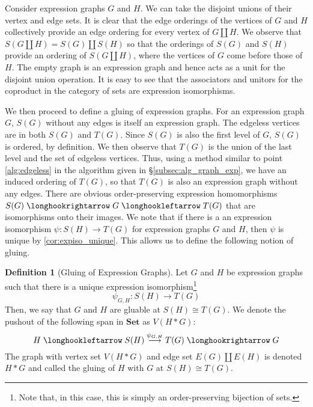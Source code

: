 \documentclass{amsart}
\renewcommand{\to}[1][]{\stackrel{#1}{\longrightarrow}}
\newcommand{\hto}[1][]{\stackrel{#1}{\longhookrightarrow}}
\newcommand{\hot}[1][]{\stackrel{#1}{\longhookleftarrow}}
\newcommand{\Set}{\textbf{Set}}
\numberwithin{thm}{section}
\theoremstyle{definition}
\newtheorem{defn}[thm]{Definition}
\begin{document}
Consider expression graphs $G$ and $H$. We can take the disjoint unions of their
vertex and edge sets. It is clear that the edge orderings of the vertices of
$G$ and $H$ collectively provide an edge ordering for every vertex of
$G \amalg H$. We observe that $S(G \amalg H) = S(G) \amalg S(H)$ so that the
orderings of $S(G)$ and $S(H)$ provide an ordering of $S(G \amalg H)$, where the
vertices of $G$ come before those of $H$. The empty graph is an expression graph
and hence acts as a unit for the disjoint union operation. It is easy to see
that the associators and unitors for the coproduct in the category of sets are
expression isomorphisms.

We then proceed to define a gluing of expression graphs. For an expression
graph $G$, $S(G)$ without any edges is itself an expression graph.
The edgeless vertices are in both $S(G)$ and $T(G)$. Since $S(G)$ is also the
first level of $G$, $S(G)$ is ordered, by definition. We then observe that
$T(G)$ is the union of the last level and the set of edgeless vertices. Thus,
using a method similar to point \ref{alg:edgeless} in the algorithm given in
\S\ref{subsec:alg_graph_exp}, we have an induced ordering of $T(G)$, so that
$T(G)$ is also an expression graph without any edges.
There are obvious order-preserving expression homomorphisms
$S(G) \hto G \hot T(G)$ that are isomorphisms onto their images. We note
that if there is a an expression isomorphism $\psi : S(H) \to T(G)$ for
expression graphs $G$ and $H$, then $\psi$ is unique by \ref{cor:expiso_unique}.
This allows us to define the following notion of gluing.

\begin{defn}[Gluing of Expression Graphs]
Let $G$ and $H$ be expression graphs such that there is a unique expression
isomorphism\footnote{Note that, in this case, this is simply an order-preserving
bijection of sets.}
\[
  \psi_{G, H} : S(H) \to T(G)
\]
Then, we say that $G$ and $H$ are gluable at $S(H) \cong T(G)$. We denote the
pushout of the following span in $\Set$ as $V(H * G)$:
\[
  H \hot S(H) \to[\psi_{G, H}] T(G) \hto G
\]
The graph with vertex set $V(H * G)$ and edge set $E(G) \amalg E(H)$ is denoted
$H * G$ and called the gluing of $H$ with $G$ at $S(H) \cong T(G)$.
\end{defn}
\end{document}
